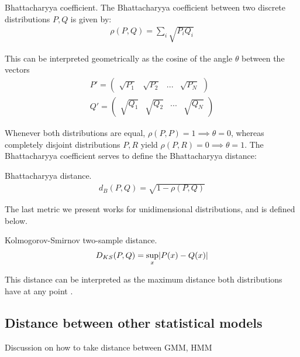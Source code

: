 \documentclass[../main.tex]{subfiles}
\begin{document}
\begin{definition}{Bhattacharyya coefficient.} \label{def_bhattacharyyacoef}
The Bhattacharyya coefficient between two discrete distributions $P, Q$ is given by:
\begin{align*}
\rho(P, Q) = \sum_i{\sqrt{P_iQ_i}}
\end{align*}
\par This can be interpreted geometrically as the cosine of the angle $\theta$ between the vectors \begin{align*}
P' = \begin{pmatrix}\sqrt{P_1}&\sqrt{P_2}&...&\sqrt{P_N}\end{pmatrix}\\
Q' = \begin{pmatrix}\sqrt{Q_1}&\sqrt{Q_2}&...&\sqrt{Q_N}\end{pmatrix}
\end{align*}
\end{definition}
\par Whenever both distributions are equal, $\rho(P, P) = 1 \implies \theta = 0$, whereas completely disjoint distributions $P, R$ yield $\rho(P, R) = 0 \implies \theta = 1$. The Bhattacharyya coefficient serves to define the Bhattacharyya distance:
\begin{definition}{Bhattacharyya distance.} \label{def_bhattacharyya}
\begin{align*}
d_B(P, Q) = \sqrt{1 - \rho(P, Q)}
\end{align*}
\end{definition}

\par The last metric we present works for unidimensional distributions, and is defined below.
\begin{definition}{Kolmogorov-Smirnov two-sample distance.} \label{def_ks2s}
\begin{align*}
D_{KS}(P, Q) = \sup_{x}\lvert P(x)-Q(x)\rvert
\end{align*}
\end{definition}
\par This distance can be interpreted as the maximum distance both distributions have at any point \cite{KSMathworks2015}.

\subsection{Distance between other statistical models}\label{subsection_models}
Discussion on how to take distance between GMM, HMM
\end{document}
